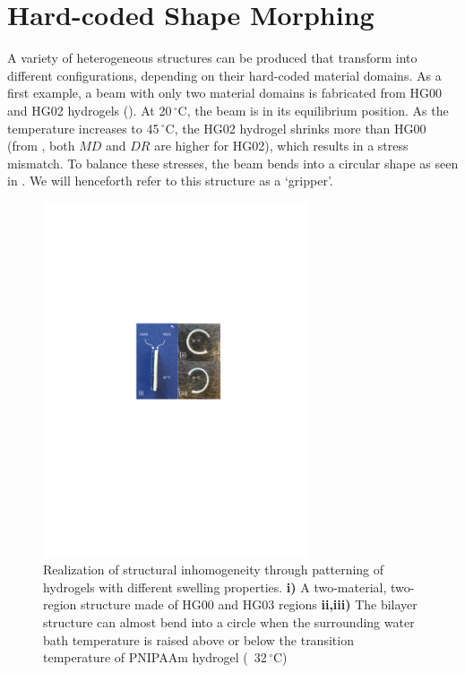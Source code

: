 \section{Hard-coded Shape Morphing}
A variety of heterogeneous structures can be produced that transform into different configurations, depending on their hard-coded material domains.
As a first example, a beam with only two material domains is fabricated from HG00 and HG02 hydrogels (). 
At 20\,$^{\circ}$C, the beam is in its equilibrium position. As the temperature increases to 45\,$^{\circ}$C, the HG02 hydrogel shrinks more than HG00 (from , both $MD$ and $DR$ are higher for HG02), 
which results in a stress mismatch. To balance these stresses, the beam bends into a circular shape as seen in .
We will henceforth refer to this structure as a `gripper'. %
\begin{figure}[!ht]
\centering
\includegraphics[width=0.7\textwidth]{bilayer.pdf}
\caption[Realization of structural inhomogeneity]{Realization of structural inhomogeneity through patterning of hydrogels with different swelling properties. \textbf{i)} A two-material, two-region structure made of HG00 and HG03 regions \textbf{ii,iii)} The bilayer structure can almost bend into a circle when the surrounding water bath temperature is raised above or below the transition temperature of PNIPAAm hydrogel (~32\,$^{\circ}$C)}
\label{fig:bilayer}
\end{figure}


